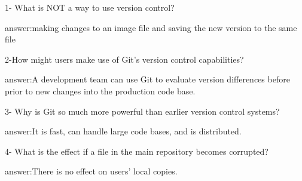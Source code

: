 1- What is NOT a way to use version control?

answer:making changes to an image file and saving the new version to the same file

2-How might users make use of Git's version control capabilities?

answer:A development team can use Git to evaluate version differences before prior to new changes into the production code base.

3- Why is Git so much more powerful than earlier version control systems?

answer:It is fast, can handle large code bases, and is distributed.

4- What is the effect if a file in the main repository becomes corrupted?

answer:There is no effect on users' local copies.

